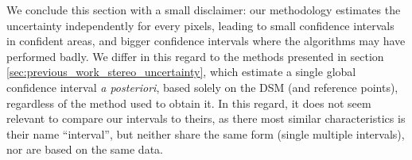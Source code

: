 We conclude this section with a small disclaimer: our methodology estimates the uncertainty independently for every pixels, leading to small confidence intervals in confident areas, and bigger confidence intervals where the algorithms may have performed badly. We differ in this regard to the methods presented in section \ref{sec:previous_work_stereo_uncertainty}, which estimate a single global confidence interval \textit{a posteriori}, based solely on the DSM (and reference points), regardless of the method used to obtain it. In this regard, it does not seem relevant to compare our intervals to theirs, as there most similar characteristics is their name ``interval'', but neither share the same form (single \vs multiple intervals), nor are based on the same data. 

\pagebreak
\blankpage